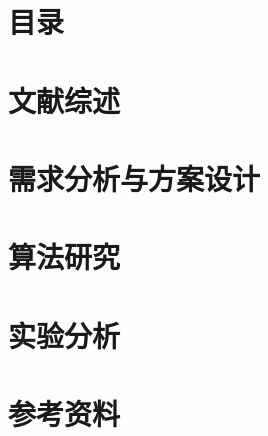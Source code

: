 \documentclass[twoside]{article}
\begin{document}
\section*{目录}

\section{文献综述}

\section{需求分析与方案设计}

\section{算法研究}

\section{实验分析}

\section{参考资料}
\end{document}
